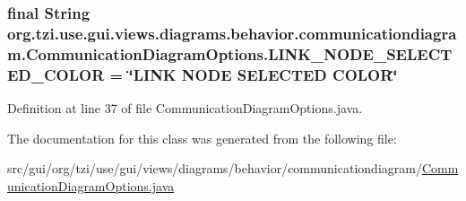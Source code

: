 \hypertarget{classorg_1_1tzi_1_1use_1_1gui_1_1views_1_1diagrams_1_1behavior_1_1communicationdiagram_1_1_communication_diagram_options_a4ffcbd4917cf3dd4405b82b99d6eb418}{
\subsubsection[{L\-I\-N\-K\-\_\-\-N\-O\-D\-E\-\_\-\-S\-E\-L\-E\-C\-T\-E\-D\-\_\-\-C\-O\-L\-O\-R}]{\setlength{\rightskip}{0pt plus 5cm}final String org.\-tzi.\-use.\-gui.\-views.\-diagrams.\-behavior.\-communicationdiagram.\-Communication\-Diagram\-Options.\-L\-I\-N\-K\-\_\-\-N\-O\-D\-E\-\_\-\-S\-E\-L\-E\-C\-T\-E\-D\-\_\-\-C\-O\-L\-O\-R = \char`\"{}L\-I\-N\-K N\-O\-D\-E S\-E\-L\-E\-C\-T\-E\-D C\-O\-L\-O\-R\char`\"{}\hspace{0.3cm}{\ttfamily [static]}}}\label{classorg_1_1tzi_1_1use_1_1gui_1_1views_1_1diagrams_1_1behavior_1_1communicationdiagram_1_1_communication_diagram_options_a4ffcbd4917cf3dd4405b82b99d6eb418}


Definition at line 37 of file Communication\-Diagram\-Options.\-java.



The documentation for this class was generated from the following file\-:\begin{DoxyCompactItemize}
\item 
src/gui/org/tzi/use/gui/views/diagrams/behavior/communicationdiagram/\hyperlink{_communication_diagram_options_8java}{Communication\-Diagram\-Options.\-java}\end{DoxyCompactItemize}
